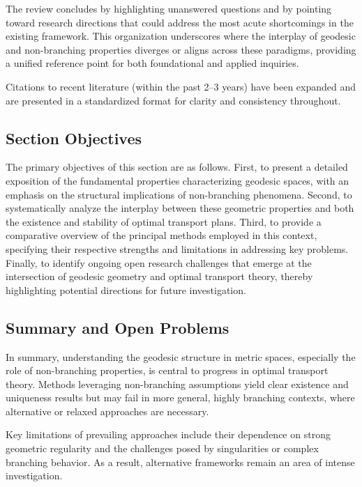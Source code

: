 \documentclass[sigconf]{acmart}
\begin{document}
The review concludes by highlighting unanswered questions and by pointing toward research directions that could address the most acute shortcomings in the existing framework. This organization underscores where the interplay of geodesic and non-branching properties diverges or aligns across these paradigms, providing a unified reference point for both foundational and applied inquiries.

Citations to recent literature (within the past 2--3 years) have been expanded and are presented in a standardized format for clarity and consistency throughout.

\subsection*{Section Objectives}
The primary objectives of this section are as follows.
First, to present a detailed exposition of the fundamental properties characterizing geodesic spaces, with an emphasis on the structural implications of non-branching phenomena. Second, to systematically analyze the interplay between these geometric properties and both the existence and stability of optimal transport plans. Third, to provide a comparative overview of the principal methods employed in this context, specifying their respective strengths and limitations in addressing key problems. Finally, to identify ongoing open research challenges that emerge at the intersection of geodesic geometry and optimal transport theory, thereby highlighting potential directions for future investigation.


\subsection*{Summary and Open Problems}

In summary, understanding the geodesic structure in metric spaces, especially the role of non-branching properties, is central to progress in optimal transport theory. Methods leveraging non-branching assumptions yield clear existence and uniqueness results but may fail in more general, highly branching contexts, where alternative or relaxed approaches are necessary.

Key limitations of prevailing approaches include their dependence on strong geometric regularity and the challenges posed by singularities or complex branching behavior. As a result, alternative frameworks remain an area of intense investigation.
\end{document}
